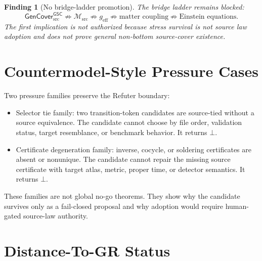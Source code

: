 \documentclass[11pt]{article}
\newcommand{\Msrc}{\mathcal{M}_{\mathrm{src}}}
\newcommand{\geff}{g_{\mathrm{eff}}}
\newcommand{\GenCover}{\mathsf{GenCover}_{\mathrm{src}}^{\mathsf{GSC}}}
\newcommand{\Bot}{\bot}
\newtheorem{finding}{Finding}
\begin{document}
\begin{finding}[No bridge-ladder promotion]
The bridge ladder remains blocked:
\[
  \GenCover \nRightarrow \Msrc \nRightarrow \geff
  \nRightarrow \text{matter coupling}
  \nRightarrow \text{Einstein equations}.
\]
The first implication is not authorized because stress survival is not source
law adoption and does not prove general non-bottom source-cover existence.
\end{finding}

\section{Countermodel-Style Pressure Cases}

Two pressure families preserve the Refuter boundary:

\begin{itemize}
  \item Selector tie family: two transition-token candidates are source-tied
  without a source equivalence. The candidate cannot choose by file order,
  validation status, target resemblance, or benchmark behavior. It returns
  \(\Bot\).
  \item Certificate degeneration family: inverse, cocycle, or soldering
  certificates are absent or nonunique. The candidate cannot repair the
  missing source certificate with target atlas, metric, proper time, or
  detector semantics. It returns \(\Bot\).
\end{itemize}

These families are not global no-go theorems. They show why the candidate
survives only as a fail-closed proposal and why adoption would require
human-gated source-law authority.

\section{Distance-To-GR Status}
\end{document}
